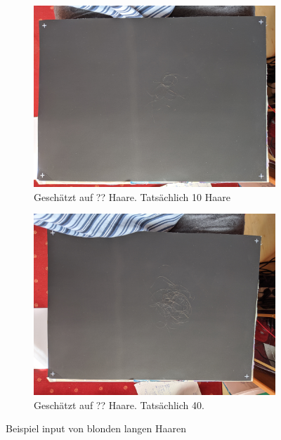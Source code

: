 \documentclass[german,a4paper, 12pt]{llncs}
\begin{document}
\begin{figure}
	\centering
	\begin{subfigure}[b]{0.475\textwidth}
		\centering
		\includegraphics[width=\textwidth]{figJan/IMG_20200325_133957_10.jpg}
		\caption[]{Geschätzt auf ?? Haare. Tatsächlich 10 Haare}
		\label{img:tstJan1} 
	\end{subfigure}
	\hfill
	\begin{subfigure}[b]{0.475\textwidth} 
		\centering
		\includegraphics[width=\textwidth]{figJan/IMG_20200325_134247_40.jpg}
		\caption[]{Geschätzt auf ?? Haare. Tatsächlich 40.}
		\label{img:tstJan2}
	\end{subfigure}
	\caption[  ]
	{\small Beispiel input von blonden langen Haaren} 
	\label{img:tstJan}
\end{figure}
\end{document}
